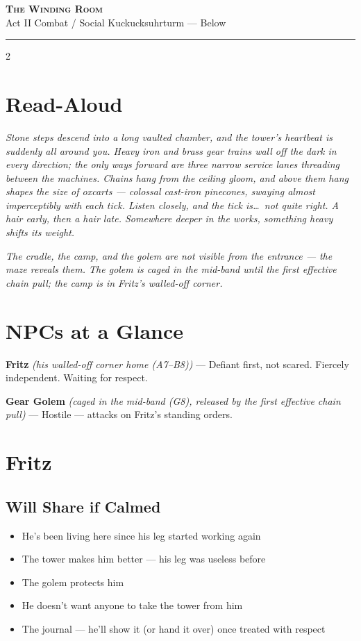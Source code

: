 \documentclass[10pt,letterpaper]{article}
\newcommand{\sceneheader}[4]{%
  \fancyhead[L]{\small\textcolor{accent}{\scshape #1}}%
  \fancyhead[R]{\small\textcolor{accent}{#2 \quad \textbullet \quad #3}}%
  \begin{center}
  {\LARGE\bfseries\scshape\textcolor{accent}{#1}}\\[2pt]
  {\small #2 \quad \textbullet \quad #3 \quad \textbullet \quad #4}\\[2pt]
  \textcolor{rulecol}{\rule{0.5\textwidth}{0.8pt}}
  \end{center}
  \vspace{-4pt}
}
\newcommand{\npc}[3]{\textbf{#1} \textit{(#2)} --- #3}
\begin{document}
\newpage


\label{sec:gearroom}\sceneheader{The Winding Room}{Act II}{Combat / Social}{Kuckucksuhrturm --- Below}

\begin{multicols}{2}

\section*{Read-Aloud}
\begin{readaloud}
\itshape
Stone steps descend into a long vaulted chamber, and the tower's heartbeat is suddenly all around you. Heavy iron and brass gear trains wall off the dark in every direction; the only ways forward are three narrow service lanes threading between the machines. Chains hang from the ceiling gloom, and above them hang shapes the size of oxcarts --- colossal cast-iron pinecones, swaying almost imperceptibly with each tick. Listen closely, and the tick is\ldots\ not quite right. A hair early, then a hair late. Somewhere deeper in the works, something heavy shifts its weight.
\end{readaloud}

\textit{The cradle, the camp, and the golem are not visible from the entrance --- the maze reveals them. The golem is caged in the mid-band until the first effective chain pull; the camp is in Fritz's walled-off corner.}

\section*{NPCs at a Glance}

\npc{Fritz}{his walled-off corner home (A7--B8)}{Defiant first, not scared. Fiercely independent. Waiting for respect.}

\npc{Gear Golem}{caged in the mid-band (G8), released by the first effective chain pull}{Hostile --- attacks on Fritz's standing orders.}

\section*{Fritz}
\subsection*{Will Share if Calmed}
\begin{itemize}
\item He's been living here since his leg started working again
\item The tower makes him better --- his leg was useless before
\item The golem protects him
\item He doesn't want anyone to take the tower from him
\item The journal --- he'll show it (or hand it over) once treated with respect
\end{itemize}

\end{multicols}
\end{document}
